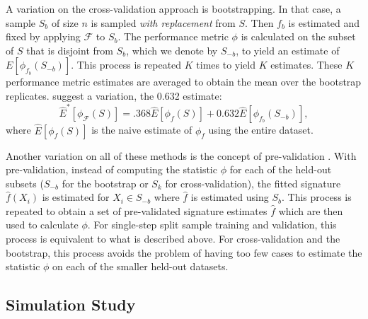 \documentclass[11pt,]{article}
\begin{document}
A variation on the cross-validation approach is bootstrapping. In that
case, a sample \(S_b\) of size \(n\) is sampled \emph{with replacement}
from \(S\). Then \(f_{b}\) is estimated and fixed by applying
\(\mathcal{F}\) to \(S_{b}\). The performance metric \(\phi\) is
calculated on the subset of \(S\) that is disjoint from \(S_b\), which
we denote by \(S_{-b}\), to yield an estimate of
\(E[\phi_{f_b}(S_{-b})]\). This process is repeated \(K\) times to yield
\(K\) estimates. These \(K\) performance metric estimates are averaged
to obtain the mean over the bootstrap replicates.
\citet{efron1997improvements} suggest a variation, the 0.632 estimate:
\[
\hat{E}^*[\phi_{\mathcal{F}}(S)] = .368 \hat{E}[\phi_{f}(S)] + 0.632 \hat{E}[\phi_{f_b}(S_{-b})],
\] where \(\hat{E}[\phi_{f}(S)]\) is the naive estimate of \(\phi_f\)
using the entire dataset.

Another variation on all of these methods is the concept of
pre-validation \citep{tibshirani2002pre}. With pre-validation, instead
of computing the statistic \(\phi\) for each of the held-out subsets
(\(S_{-b}\) for the bootstrap or \(S_{k}\) for cross-validation), the
fitted signature \(\hat{f}(X_i)\) is estimated for \(X_i \in S_{-b}\)
where \(\hat{f}\) is estimated using \(S_{b}\). This process is repeated
to obtain a set of pre-validated signature estimates \(\hat{f}\) which
are then used to calculate \(\phi\). For single-step split sample
training and validation, this process is equivalent to what is described
above. For cross-validation and the bootstrap, this process avoids the
problem of having too few cases to estimate the statistic \(\phi\) on
each of the smaller held-out datasets.

\subsection{Simulation Study}\label{simulation-study}
\end{document}
